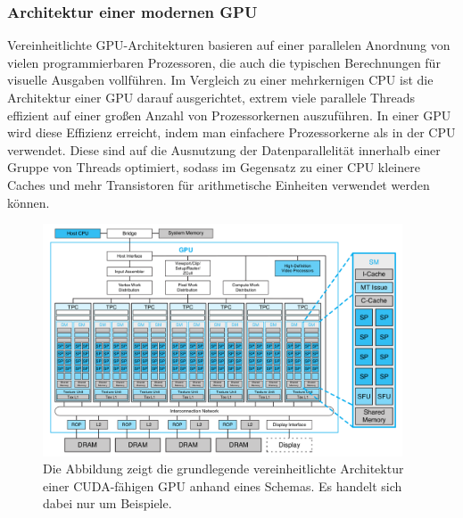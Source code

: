\documentclass[crop=false]{standalone}
\begin{document}
      \subsubsection{Architektur einer modernen GPU} %
      \label{ssub:architektur_einer_modernen_gpu}
        Vereinheitlichte GPU-Architekturen basieren auf einer parallelen Anordnung von vielen programmierbaren Prozessoren, die auch die typischen Berechnungen für visuelle Ausgaben vollführen.
        Im Vergleich zu einer mehrkernigen CPU ist die Architektur einer GPU darauf ausgerichtet, extrem viele parallele Threads effizient auf einer großen Anzahl von Prozessorkernen auszuführen.
        In einer GPU wird diese Effizienz erreicht, indem man einfachere Prozessorkerne als in der CPU verwendet.
        Diese sind auf die Ausnutzung der Datenparallelität innerhalb einer Gruppe von Threads optimiert, sodass im Gegensatz zu einer CPU kleinere Caches und mehr Transistoren für arithmetische Einheiten verwendet werden können.
        \cite[S.~A11]{Patterson2011}

        \begin{figure}[h]
          \center
          \includegraphics[width=0.95\textwidth]{images/unified_gpu_architecture.png}
          \caption[Grundlegende vereinheitlichte Architektur einer CUDA-fähigen GPU]{%
            Die Abbildung zeigt die grundlegende vereinheitlichte Architektur einer CUDA-fähigen GPU anhand eines Schemas.
            Es handelt sich dabei nur um Beispiele.
            \cite[S.~9]{Kirk2010}
          }
          \label{fig:gpu-architecture}
        \end{figure}
\end{document}
